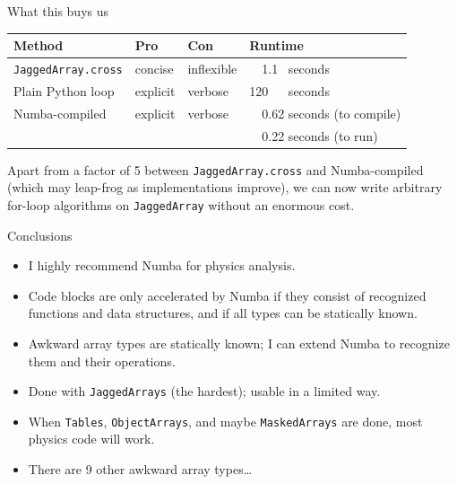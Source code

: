 \documentclass[aspectratio=169]{beamer}
\begin{document}
\begin{frame}{What this buys us}
\large
\vspace{0.5 cm}
\begin{center}
\begin{tabular}{l l l l}
{\bf Method} & {\bf Pro}  & {\bf Con}  & {\bf Runtime} \\\hline
{\tt\normalsize JaggedArray.cross} & concise  & inflexible & \textcolor{white}{12}1.1\textcolor{white}{2} seconds \\
Plain Python loop       & explicit & verbose    & 120\textcolor{white}{.62} seconds \\
Numba-compiled          & explicit & verbose    & \textcolor{white}{12}0.62 seconds (to compile) \\
                        &          &            & \textcolor{white}{12}0.22 seconds (to run)
\end{tabular}
\end{center}

\vspace{0.25 cm}
Apart from a factor of 5 between {\tt\normalsize JaggedArray.cross} and Numba-compiled (which may leap-frog as implementations improve), we can now write arbitrary for-loop algorithms on {\tt\normalsize JaggedArray} without an enormous cost.

\vspace{0.25 cm}
\end{frame}

\begin{frame}{Conclusions}
\large
\vspace{0.5 cm}
\begin{itemize}\setlength{\itemsep}{0.25 cm}
\item I highly recommend Numba for physics analysis.
\item Code blocks are only accelerated by Numba if they consist of recognized functions and data structures, and if all types can be statically known.
\item Awkward array types are statically known; I can extend Numba to recognize them and their operations.
\item Done with {\tt\normalsize JaggedArrays} (the hardest); usable in a limited way.
\item When {\tt\normalsize Tables}, {\tt\normalsize ObjectArrays}, and maybe {\tt\normalsize MaskedArrays} are done, most physics code will work.
\item There are 9 other awkward array types\ldots
\end{itemize}
\end{frame}
\end{document}
